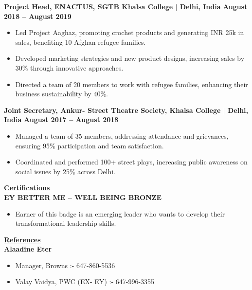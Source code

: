 \documentclass{article}
\begin{document}
\vspace{1mm}

\noindent \textbf{Project Head, ENACTUS, SGTB Khalsa College $\mid$ Delhi, India} \hfill \textbf{August 2018 – August 2019}
\begin{itemize}[noitemsep,nolistsep,leftmargin=*]
\item {\small Led Project Aaghaz, promoting crochet products and generating INR 25k in sales, benefiting 10 Afghan refugee families.}
\item {\small Developed marketing strategies and new product designs, increasing sales by 30\% through innovative approaches.}
\item {\small Directed a team of 20 members to work with refugee families, enhancing their business sustainability by 40\%.}
\end{itemize}

\vspace{1mm}

\noindent \textbf{Joint Secretary, Ankur- Street Theatre Society, Khalsa College $\mid$ Delhi, India} \hfill \textbf{August 2017 – August 2018}
\begin{itemize}[noitemsep,nolistsep,leftmargin=*]
\item {\small Managed a team of 35 members, addressing attendance and grievances, ensuring 95\% participation and team satisfaction.}
\item {\small Coordinated and performed 100+ street plays, increasing public awareness on social issues by 25\% across Delhi.}
\end{itemize}

\vspace{2mm}
\noindent \textbf{\underline{Certifications}} \\
\noindent \textbf{EY BETTER ME – WELL BEING BRONZE} 
\begin{itemize}[noitemsep,nolistsep,leftmargin=*]
\item {Earner of this badge is an emerging leader who wants to develop their transformational leadership skills. }
\end{itemize}

\vspace{2mm}

\noindent \textbf{\underline{References}} \\
\noindent \textbf{Alaadine Eter} 
\begin{itemize}[noitemsep,nolistsep,leftmargin=*]
\item {Manager, Browns :- 647-860-5536 }
\item {Valay Vaidya, PWC (EX- EY) :- 647-996-3355}
\end{itemize}
\end{document}
